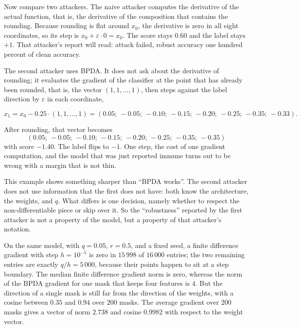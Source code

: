 Now compare two attackers. The naive attacker computes the derivative of the actual
function, that is, the derivative of the composition that contains the rounding. Because rounding
is flat around $x_0$, the derivative is zero in all eight coordinates, so its step is
$x_0 + \varepsilon\cdot 0 = x_0$. The score stays $0.60$ and the label stays $+1$.
That attacker's report will read: attack failed, robust accuracy one hundred
percent of clean accuracy.

The second attacker uses BPDA. It does not ask about the derivative of rounding; it
evaluates the gradient of the classifier at the point that has already been rounded, that is, the
vector $(1,1,\dots,1)$, then steps against the label direction by $\varepsilon$ in each
coordinate,

\begin{equation}
x_1 = x_0 - 0.25\cdot(1,1,\dots,1)
= (0.05;\ -0.05;\ -0.10;\ -0.15;\ -0.20;\ -0.25;\ -0.35;\ -0.33).
\end{equation}

After rounding, that vector becomes
\[
(0.05;\ -0.05;\ -0.10;\ -0.15;\ -0.20;\ -0.25;\ -0.35;\ -0.35)
\]
with score $-1.40$. The label flips to $-1$. One step, the cost of one
gradient computation, and the model that was just reported immune turns out to be wrong with a margin
that is not thin.

This example shows something sharper than ``BPDA works''. The second attacker
does not use information that the first does not have: both know the
architecture, the weights, and $q$. What differs is one decision, namely whether to respect the
non-differentiable piece or skip over it. So the ``robustness'' reported by the first attacker
is not a property of the model, but a property of that attacker's notation.

\begin{contoh}
On the same model, with $q=0.05$, $r=0.5$, and a fixed seed, a finite
difference gradient with step $h=10^{-5}$ is zero in $15\,998$ of $16\,000$ entries;
the two remaining entries are exactly $q/h=5\,000$, because their points happen to sit at a step
boundary. The median finite difference gradient norm is zero, whereas the norm of the
BPDA gradient for one mask that keeps four features is $4$. But the direction of a single
mask is still far from the direction of the weights, with a cosine between $0.35$ and $0.94$ over
$200$ masks. The average gradient over $200$ masks gives a vector of norm $2.738$ and
cosine $0.9982$ with respect to the weight vector.
\end{contoh}


